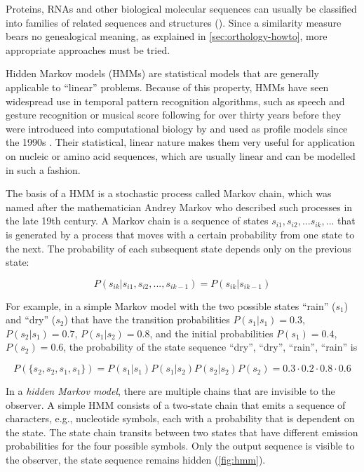 \label{sec:hmms}
Proteins, RNAs and other biological molecular sequences can usually be
classified into families of related sequences and structures
(\cite{henikoff1997}). Since a similarity measure bears no genealogical meaning,
as explained in \autoref{sec:orthology-howto}, more appropriate approaches must
be tried.

Hidden Markov models (HMMs) are statistical models that are generally applicable
to ``linear'' problems. Because of this property, HMMs have seen widespread use
in temporal pattern recognition algorithms, such as speech and gesture
recognition or musical score following for over thirty years before they were
introduced into computational biology by \citet{churchill1989} and used as
profile models since the 1990s \citep{krogh1994}. Their statistical, linear
nature makes them very useful for application on nucleic or amino acid
sequences, which are usually linear and can be modelled in such a fashion. 

The basis of a HMM is a stochastic process called Markov chain, which was named
after the mathematician Andrey Markov who described such processes in the late
19th century. A Markov chain is a sequence of states $s_{i1}, s_{i2}, ...
s_{ik}, ...$ that is generated by a process that moves with a certain probability
from one state to the next. The probability of each subsequent state depends
only on the previous state:

\begin{equation}
P(s_{ik} | s_{i1}, s_{i2}, ..., s_{ik-1}) = P(s_{ik} | s_{ik-1})
\label{eqn:markov-chain}
\end{equation}

For example, in a simple Markov model with the two possible states ``rain''
($s_1$) and ``dry'' ($s_2$) that have the transition probabilities $P(s_1|s_1) =
0.3$, $P(s_2|s_1) = 0.7$, $P(s_1|s_2) = 0.8$, and the initial probabilities
$P(s_1) = 0.4$, $P(s_2) = 0.6$, the probability of the state sequence ``dry'',
``dry'', ``rain'', ``rain'' is

\begin{equation}
P(\{s_2, s_2, s_1, s_1\}) = P(s_1|s_1) P(s_1|s_2) P(s_2|s_2) P(s_2) = 0.3 \cdot 0.2 \cdot 0.8 \cdot 0.6
\label{eqn:markov-chain-weather}
\end{equation}

In a \emph{hidden Markov model}, there are multiple chains that are invisible to the
observer. A simple HMM consists of a two-state chain that emits a sequence of
characters, e.g., nucleotide symbols, each with a probability that is dependent
on the state. The state chain transits between two states that have different
emission probabilities for the four possible symbols. Only the output sequence
is visible to the observer, the state sequence remains hidden
(\autoref{fig:hmm}).




